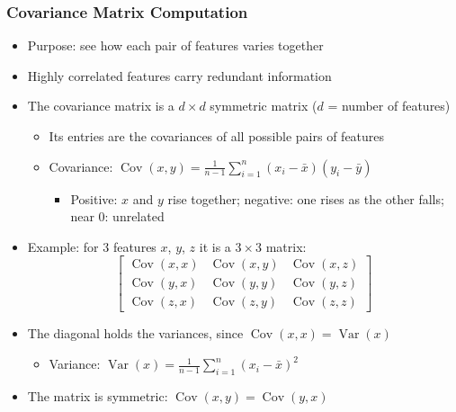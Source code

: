 \begin{frame}[fragile] \frametitle{Covariance Matrix Computation}
\begin{itemize}
\item Purpose: see how each pair of features varies together
\item Highly correlated features carry redundant information
\item The covariance matrix is a $d \times d$ symmetric matrix ($d$ = number of features)
\begin{itemize}
\item Its entries are the covariances of all possible pairs of features
\item Covariance: $\operatorname{Cov}(x,y) = \frac{1}{n-1}\sum_{i=1}^{n}(x_i-\bar{x})(y_i-\bar{y})$
\begin{itemize}
\item Positive: $x$ and $y$ rise together; negative: one rises as the other falls; near 0: unrelated
\end{itemize}
\end{itemize}
\item Example: for 3 features $x$, $y$, $z$ it is a $3 \times 3$ matrix:
\[
\begin{bmatrix}
\operatorname{Cov}(x,x) & \operatorname{Cov}(x,y) & \operatorname{Cov}(x,z) \\
\operatorname{Cov}(y,x) & \operatorname{Cov}(y,y) & \operatorname{Cov}(y,z) \\
\operatorname{Cov}(z,x) & \operatorname{Cov}(z,y) & \operatorname{Cov}(z,z)
\end{bmatrix}
\]
\item The diagonal holds the variances, since $\operatorname{Cov}(x,x) = \operatorname{Var}(x)$
\begin{itemize}
\item Variance: $\operatorname{Var}(x) = \frac{1}{n-1}\sum_{i=1}^{n}(x_i-\bar{x})^2$
\end{itemize}
\item The matrix is symmetric: $\operatorname{Cov}(x,y) = \operatorname{Cov}(y,x)$
\end{itemize}
\end{frame}

